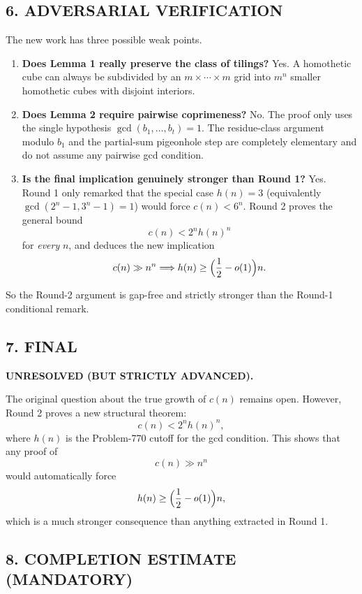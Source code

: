 \subsection*{6. ADVERSARIAL VERIFICATION}

The new work has three possible weak points.

\begin{enumerate}
\item \textbf{Does Lemma 1 really preserve the class of tilings?}  
Yes.
A homothetic cube can always be subdivided by an $m\times\cdots\times m$ grid into $m^n$ smaller homothetic cubes with disjoint interiors.

\item \textbf{Does Lemma 2 require pairwise coprimeness?}  
No.
The proof only uses the single hypothesis $\gcd(b_1,\dots,b_t)=1$.
The residue-class argument modulo $b_1$ and the partial-sum pigeonhole step are completely elementary and do not assume any pairwise gcd condition.

\item \textbf{Is the final implication genuinely stronger than Round 1?}  
Yes.
Round 1 only remarked that the special case $h(n)=3$ (equivalently $\gcd(2^n-1,3^n-1)=1$) would force $c(n)<6^n$.
Round 2 proves the general bound
\[
c(n)<2^n h(n)^n
\]
for \emph{every} $n$, and deduces the new implication
\[
c(n)\gg n^n \Longrightarrow h(n)\ge \Bigl(\frac12-o(1)\Bigr)n.
\]
\end{enumerate}

So the Round-2 argument is gap-free and strictly stronger than the Round-1 conditional remark.

\subsection*{7. FINAL}

\textbf{UNRESOLVED (BUT STRICTLY ADVANCED).}

The original question about the true growth of $c(n)$ remains open.
However, Round 2 proves a new structural theorem:
\[
c(n)<2^n h(n)^n,
\]
where $h(n)$ is the Problem-770 cutoff for the gcd condition.
This shows that any proof of
\[
c(n)\gg n^n
\]
would automatically force
\[
h(n)\ge \Bigl(\frac12-o(1)\Bigr)n,
\]
which is a much stronger consequence than anything extracted in Round 1.

\subsection*{8. COMPLETION ESTIMATE (MANDATORY)}

